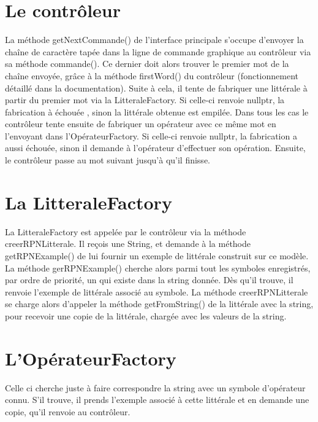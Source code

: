 \section{Le contrôleur}
La méthode getNextCommande() de l'interface principale s'occupe d'envoyer la chaîne de caractère tapée dans la ligne de commande graphique au contrôleur via sa méthode commande().
\newline \newline
Ce dernier doit alors trouver le premier mot de la chaîne envoyée, grâce à la méthode firstWord() du contrôleur (fonctionnement détaillé dans la documentation). Suite à cela, il tente de fabriquer une littérale à partir du premier mot via la LitteraleFactory. Si celle-ci renvoie nullptr, la fabrication à échouée , sinon la littérale obtenue est empilée. Dans tous les cas le contrôleur tente ensuite de fabriquer un opérateur avec ce même mot en l'envoyant dans l'OpérateurFactory. Si celle-ci renvoie nullptr, la fabrication a aussi échouée, sinon il demande à l'opérateur d'effectuer son opération. Ensuite, le contrôleur passe au mot suivant jusqu'à qu'il finisse.

\section{La LitteraleFactory}
La LitteraleFactory est appelée par le contrôleur via la méthode creerRPNLitterale. Il reçois une String, et demande à la méthode getRPNExample() de lui fournir un exemple de littérale construit sur ce modèle. La méthode gerRPNExample() cherche alors parmi tout les symboles enregistrés, par ordre de priorité, un qui existe dans la string donnée. Dès qu'il trouve, il renvoie l'exemple de littérale associé au symbole. La méthode creerRPNLitterale se charge alors d'appeler la méthode getFromString() de la littérale avec la string, pour recevoir une copie de la littérale, chargée avec les valeurs de la string.

\section{L'OpérateurFactory}
Celle ci cherche juste à faire correspondre la string avec un symbole d'opérateur connu. S'il trouve, il prends l'exemple associé à cette littérale et en demande une copie, qu'il renvoie au contrôleur.


